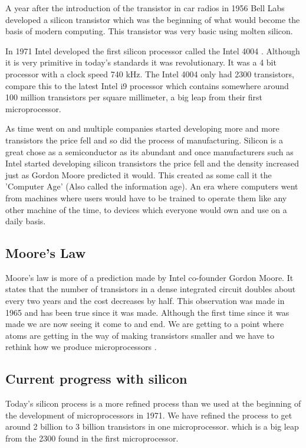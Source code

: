 \documentclass[journal]{IEEEtran}
\begin{document}
A year after the introduction of the transistor in car radios in 1956 Bell Labs \cite{8896076320180101} developed a silicon transistor which was the beginning of what would become the basis of modern computing. This transistor was very basic using molten silicon.

In 1971 Intel developed the first silicon processor called the Intel 4004 \cite{8732145520170101}. Although it is very primitive in today's standards it was revolutionary. It was a 4 bit processor with a clock speed 740 kHz. The Intel 4004 only had 2300 transistors, compare this to the latest Intel i9 processor which contains somewhere around 100 million transistors per square millimeter, a big leap from their first microprocessor. 

As time went on and multiple companies started developing more and more transistors the price fell and so did the process of manufacturing. Silicon is a great chose as a semiconductor as its abundant and once manufacturers such as Intel started developing silicon transistors the price fell and the density increased just as Gordon Moore predicted it would. This created as some call it the 'Computer Age' (Also called the information age). An era where computers went from machines where users would have to be trained to operate them like any other machine of the time, to devices which everyone would own and use on a daily basis.

\subsection{Moore's Law}
Moore's law \cite{12560013020170101} is more of a prediction made by Intel co-founder Gordon Moore. It states that the number of transistors in a dense integrated circuit doubles about every two years and the cost decreases by half. This observation was made in 1965 and has been true since it was made. Although the first time since it was made we are now seeing it come to and end. We are getting to a point where atoms are getting in the way of making transistors smaller and we have to rethink how we produce microprocessors \cite{591665} \cite{12896637520180324}.

\subsection{Current progress with silicon}
Today's silicon process is a more refined process than we used at the beginning of the development of microprocessors in 1971. We have refined the process to get around 2 billion to 3 billion transistors in one microprocessor. which is a big leap from the 2300 found in the first microprocessor.
\end{document}
